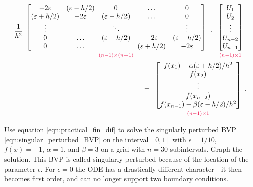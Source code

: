 \begin{align}
    \label{eqn:practical_fin_dif}
    \begin{split}
\frac{1}{h^2}
\begin{array}{c}
\begin{bmatrix}-2\epsilon & (\epsilon - h/2) &0&\hdots &0 \\ (\epsilon + h/2) &-2\epsilon & (\epsilon - h/2) &\hdots &0\\ \vdots &  & \ddots & &\vdots \\
0 & \hdots & (\epsilon + h/2) &-2\epsilon & (\epsilon - h/2) \\ 0 & \hdots & & (\epsilon + h/2) &-2\epsilon
\end{bmatrix}\\
{\scriptstyle\textcolor{red}{(n-1)\times(n-1)}}
\end{array}
\cdot
\begin{array}{c}
\begin{bmatrix}U_1\\U_2\\ \vdots \\U_{n-2} \\U_{n-1}\end{bmatrix}\\
{\scriptstyle\textcolor{red}{(n-1)\times1}}
\end{array}\\
 =
 \begin{array}{c}
 \begin{bmatrix}f(x_1) -\alpha(\epsilon + h/2)/h^2 \\f(x_2)\\ \vdots \\ f(x_{n-2})\\ f(x_{n-1})-\beta(\epsilon - h/2)/h^2 \end{bmatrix}\\
 {\scriptstyle\textcolor{red}{(n-1)\times1}}
 \end{array}.
    \end{split}
\end{align}



\begin{problem}
Use equation \eqref{eqn:practical_fin_dif} to solve the singularly perturbed BVP \eqref{eqn:singular_perturbed_BVP} on the interval $[0,1]$ with $\epsilon = 1/10$, $f(x) = -1$, $\alpha=1$, and $\beta=3$ on a grid with $n=30$ subintervals. Graph the solution.
This BVP is called singularly perturbed because of the location of the parameter $\epsilon$.
For $\epsilon = 0$ the ODE has a drastically different character - it then becomes first order, and can no longer support two boundary conditions.
    \label{prob:finitedifference2:prob1}
\end{problem}

